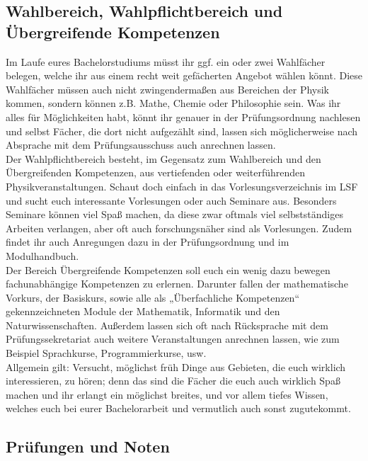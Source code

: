 \subsection{Wahlbereich, Wahlpflichtbereich und \\Übergreifende Kompetenzen}

Im Laufe eures Bachelorstudiums müsst ihr ggf. ein oder zwei Wahlfächer belegen, welche ihr aus einem recht weit gefächerten Angebot wählen könnt. Diese Wahlfächer müssen auch nicht zwingendermaßen aus Bereichen der Physik kommen, sondern können z.B. Mathe, Chemie oder Philosophie sein. Was ihr alles für Möglichkeiten habt, könnt ihr genauer in der Prüfungsordnung nachlesen und selbst Fächer, die dort nicht aufgezählt sind, lassen sich möglicherweise nach Absprache mit dem Prüfungsausschuss auch anrechnen lassen.\\

Der Wahlpflichtbereich besteht, im Gegensatz zum Wahlbereich und den Übergreifenden Kompetenzen, aus vertiefenden oder weiterführenden Physikveranstaltungen. Schaut doch einfach in das Vorlesungsverzeichnis im LSF und sucht euch interessante Vorlesungen oder auch Seminare aus. Besonders Seminare können viel Spaß machen, da diese zwar oftmals viel selbstständiges Arbeiten verlangen, aber oft auch forschungsnäher sind als Vorlesungen. Zudem findet ihr auch Anregungen dazu in der Prüfungsordnung und im Modulhandbuch.\\

Der Bereich Übergreifende Kompetenzen soll euch ein wenig dazu bewegen fachunabhängige Kompetenzen zu erlernen. Darunter fallen der mathematische Vorkurs, der Basiskurs, sowie alle als „Überfachliche Kompetenzen“ gekennzeichneten Module der Mathematik, Informatik und den Naturwissenschaften. Außerdem lassen sich oft nach Rücksprache mit dem Prüfungssekretariat auch weitere Veranstaltungen anrechnen lassen, wie zum Beispiel Sprachkurse, Programmierkurse, usw.\\

Allgemein gilt: Versucht, möglichst früh Dinge aus Gebieten, die euch wirklich interessieren, zu hören; denn das sind die Fächer die euch auch wirklich Spaß machen und ihr erlangt ein möglichst breites, und vor allem tiefes Wissen, welches euch bei eurer Bachelorarbeit und vermutlich auch sonst zugutekommt.

\subsection{Prüfungen und Noten}


